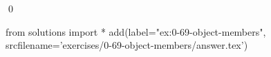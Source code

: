 
\begin{ex}
  \label{ex:0-69-object-members}
  
  \qed
\end{ex}
\begin{python0}
from solutions import *
add(label="ex:0-69-object-members",
    srcfilename='exercises/0-69-object-members/answer.tex')
\end{python0}
